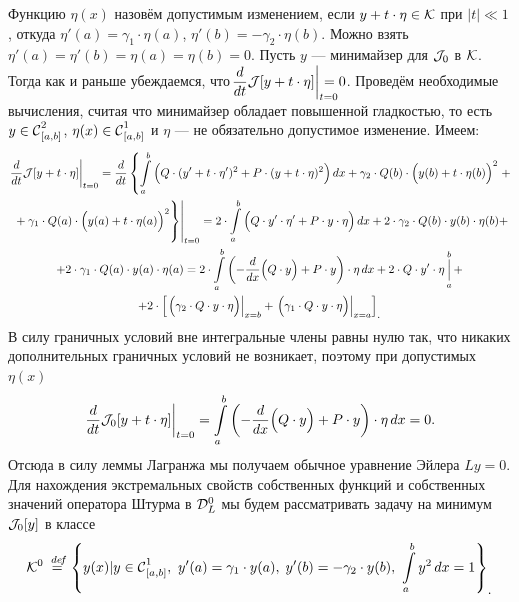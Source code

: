 Функцию $\eta(x)$ назовём допустимым изменением, если $y+t\cdot\eta\in\K$ при $|t|\ll1$, откуда $\eta'(a)={\gamma_1\cdot\eta(a)}$, $\eta'(b)=-\gamma_2\cdot\eta(b)$. Можно взять $\eta'(a)=\eta'(b)=\eta(a)=\eta(b)=0$. Пусть $y$ --- минимайзер для $\J_0$ в $\K$. Тогда как и раньше убеждаемся, что$\displaystyle\left.\der{}{t}\J[y+t\cdot\eta]\right|_{\lefteqn{\scriptstyle t=0}}=0$. Проведём необходимые вычисления, считая что минимайзер обладает повышенной гладкостью, то есть $y\in\Cfn[{[a,b]}]{2}$, ${\eta(x)\in\Cfn[{[a,b]}]{1}}$ и $\eta$ --- не обязательно допустимое изменение. Имеем:
\begin{multline*}
	\left.\der{}{t}\J[y+t\cdot\eta]\right|_{t=0}=\der{}{t}\left\{\int\limits_a^b\Big( Q\cdot(y'+t\cdot\eta')^2+P\cdot(y+t\cdot\eta)^2\Big)\,dx+\gamma_2\cdot Q(b)\cdot\Big(y(b)+t\cdot\eta(b)\Big)^2\right.+\\\left.\left.\vphantom{\int\limits_a^b}+\gamma_1\cdot Q(a)\cdot\Big(y(a)+t\cdot\eta(a)\Big)^2\right\}\right|_{t=0}=2\cdot\int\limits_a^b\Big(Q\cdot y'\cdot\eta'+P\cdot y\cdot\eta\Big)\,dx+2\cdot\gamma_2\cdot Q(b)\cdot y(b)\cdot\eta(b)+\\
	+2\cdot\gamma_1\cdot Q(a)\cdot y(a)\cdot\eta(a)=2\cdot\int\limits_a^b\left(-\der{}{x}\Big(Q\cdot y\Big)+P\cdot y\right)\cdot\eta\,dx+2\cdot Q\cdot y'\cdot\eta\mathop{\Big|}\limits_a^b+\\
	+2\cdot\left[\left.\Big(\gamma_2\cdot Q\cdot y\cdot\eta\Big)\right|_{ x=b}+\left.\Big(\gamma_1\cdot Q\cdot y\cdot\eta\Big)\right|_{ x=a}\right]_{\displaystyle.}
\end{multline*} 
В силу граничных условий вне интегральные члены равны нулю так, что никаких дополнительных граничных условий не возникает, поэтому при допустимых $\eta(x)$
\begin{equation*}
	\hfill\left.\der{}{t}\J_0[y+t\cdot\eta]\right|_{t=0}=\int\limits_a^b\left(-\der{}{x}\Big(Q\cdot y\Big)+P\cdot y\right)\cdot\eta\,dx=0.\hfill
\end{equation*} 
Отсюда в силу леммы Лагранжа мы получаем обычное уравнение Эйлера $Ly=0$. Для нахождения экстремальных свойств собственных функций и собственных значений оператора Штурма в $\mc{D}_L^0$ мы будем рассматривать задачу на минимум $\J_0[y]$ в классе 
\begin{equation*}
	\hfill\K^0\eqdef\left\{y(x)|y\in\Cfn[{[a,b]}]{1},\ y'(a)=\gamma_1\cdot y(a),\;y'(b)=-\gamma_2\cdot y(b),\ \int\limits_a^b y^2\,dx=1\right\}_{\displaystyle.}\hfill
\end{equation*}
